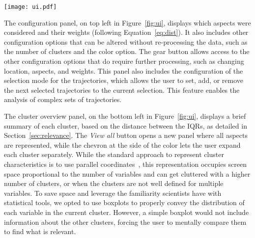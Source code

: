 \begin{figure*}
    \centering 
    \texttt{[image: ui.pdf]}
    \caption{Initial interface of our method showing the demographic evolution of Chicago. 
        \textbf{(a)}: Configuration panel with the current clustering parameters and controls.
        \textbf{(b)}: Cluster overview illustrating the most relevant aspect for each cluster. 
        \textbf{(c)}: Trajectories overview and the general evolution of the population, geographical information, and how it changed. 
        \textbf{(d)}: Details of the selected trajectories, including precise geographic locations, population numbers, and the composition of the aspects.\label{fig:ui}}
\end{figure*}


The configuration panel, on top left in Figure~\ref{fig:ui}, displays which
aspects were considered and their weights (following Equation~\ref{eq:dist}). It
also includes other configuration options that can be altered without
re-processing the data, such as the number of clusters and the color option. The
gear button allows access to the other configuration options that do require
further processing, such as changing location, aspects, and weights. This panel
also includes the configuration of the selection mode for the trajectories,
which allows the user to set, add, or remove the next selected trajectories to
the current selection. This feature enables the analysis of complex sets of
trajectories.


The cluster overview panel, on the bottom left in Figure~\ref{fig:ui}, displays
a brief summary of each cluster, based on the distance between the IQRs, as
detailed in Section~\ref{sec:relevance}. The \emph{View all} button opens a new
panel where all aspects are represented, while the chevron at the side of the
color lets the user expand each cluster separately. While the standard approach
to represent cluster characteristics is to use parallel
coordinates~\cite{johansson2005revealing,guo2006visualization}, this
representation occupies screen space proportional to the number of variables and
can get cluttered with a higher number of clusters, or when the clusters are not
well defined for multiple variables. To save space and leverage the familiarity
scientists have with statistical tools, we opted to use boxplots to properly
convey the distribution of each variable in the current cluster. However, a
simple boxplot would not include information about the other clusters, forcing
the user to mentally compare them to find what is relevant. 

